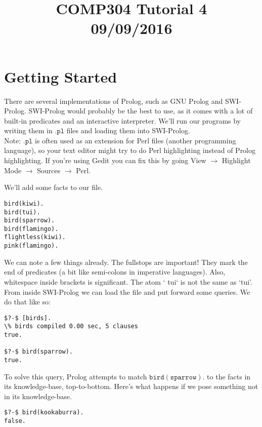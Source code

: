\documentclass[a4paper,12pt]{article}
\newcommand{\kwa}[1]{\mathtt{#1}}
\begin{document}
\title{COMP304 Tutorial 4 \\ 09/09/2016}
\date{}
\maketitle

\section{Getting Started}

There are several implementations of Prolog, such as GNU Prolog and SWI-Prolog. SWI-Prolog would probably be the best to use, as it comes with a lot of built-in predicates and an interactive interpreter. We'll run our programs by writing them in $\kwa{.pl}$ files and loading them into SWI-Prolog. \\

\noindent
Note: $\kwa{.pl}$ is often used as an extension for Perl files (another programming language), so your text editor might try to do Perl highlighting instead of Prolog highlighting. If you're using Gedit you can fix this by going View $\rightarrow$ Highlight Mode $\rightarrow$ Sources $\rightarrow$ Perl.

\noindent
We'll add some facts to our file.

\begin{lstlisting}
bird(kiwi).
bird(tui).
bird(sparrow).
bird(flamingo).
flightless(kiwi).
pink(flamingo).
\end{lstlisting}

\noindent
We can note a few things already. The fullstops are important! They mark the end of predicates (a bit like semi-colons in imperative languages). Also, whitespace inside brackets is significant. The atom ` tui` is not the same as `tui'. From inside SWI-Prolog we can load the file and put forward some queries. We do that like so:

\begin{lstlisting}
$?-$ [birds].
\% birds compiled 0.00 sec, 5 clauses
true.

$?-$ bird(sparrow).
true.
\end{lstlisting}

\noindent
To solve this query, Prolog attempts to match $\kwa{bird(sparrow).}$ to the facts in its knowledge-base, top-to-bottom. Here's what happens if we pose something not in its knowledge-base.

\begin{lstlisting}
$?-$ bird(kookaburra).
false.
\end{lstlisting}
\end{document}
